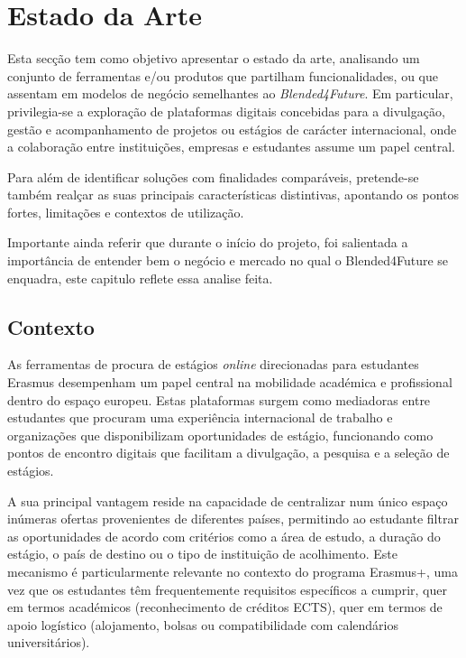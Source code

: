 \chapter{Estado da Arte}
\label{chap:estadodaarte}

Esta secção tem como objetivo apresentar o estado da arte, analisando um conjunto de ferramentas e/ou produtos que partilham funcionalidades, ou que assentam em modelos de negócio semelhantes ao \textit{Blended4Future}. Em particular, privilegia-se a exploração de plataformas digitais concebidas para a divulgação, gestão e acompanhamento de projetos ou estágios de carácter internacional, onde a colaboração entre instituições, empresas e estudantes assume um papel central.

Para além de identificar soluções com finalidades comparáveis, pretende-se também realçar as suas principais características distintivas, apontando os pontos fortes, limitações e contextos de utilização.

Importante ainda referir que durante o início do projeto, foi salientada a importância de entender bem o negócio e mercado no qual o Blended4Future se enquadra, este capitulo reflete essa analise feita.

\section{Contexto}

As ferramentas de procura de estágios \textit{online} direcionadas para estudantes Erasmus desempenham um papel central na mobilidade académica e profissional dentro do espaço europeu. Estas plataformas surgem como mediadoras entre estudantes que procuram uma experiência internacional de trabalho e organizações que disponibilizam oportunidades de estágio, funcionando como pontos de encontro digitais que facilitam a divulgação, a pesquisa e a seleção de estágios.

A sua principal vantagem reside na capacidade de centralizar num único espaço inúmeras ofertas provenientes de diferentes países, permitindo ao estudante filtrar as oportunidades de acordo com critérios como a área de estudo, a duração do estágio, o país de destino ou o tipo de instituição de acolhimento. Este mecanismo é particularmente relevante no contexto do programa Erasmus+, uma vez que os estudantes têm frequentemente requisitos específicos a cumprir, quer em termos académicos (reconhecimento de créditos ECTS), quer em termos de apoio logístico (alojamento, bolsas ou compatibilidade com calendários universitários).


